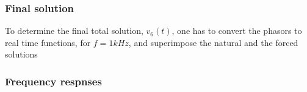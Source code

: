 






\subsubsection{Final solution}  %
To determine the final total solution, $v_6(t)$, one has to convert the phasors to real time functions, for $f=1kHz$, and superimpose the natural and the forced solutions






\subsubsection{Frequency respnses}  %










\lipsum[1-1]


